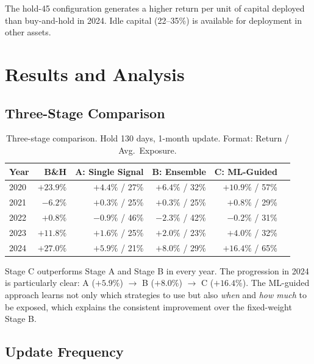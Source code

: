 \documentclass[11pt, letterpaper]{article}
\begin{document}
The hold-45 configuration generates a higher return per unit of capital deployed
than buy-and-hold in 2024. Idle capital (22--35\%) is available for deployment
in other assets.

\section{Results and Analysis}

\subsection{Three-Stage Comparison}

\begin{table}[h]
\centering
\caption{Three-stage comparison. Hold 130 days, 1-month update. Format: Return / Avg.\ Exposure.}
\label{tab:three_stage_h130}
\begin{tabular}{lrrrrr}
\toprule
Year    & B\&H      & A: Single Signal     & B: Ensemble          & C: ML-Guided \\
\midrule
2020    & $+23.9\%$ & $+4.4\%$ / 27\%      & $+6.4\%$ / 32\%      & $\mathbf{+10.9\%}$ / 57\% \\
2021    & $-6.2\%$  & $+0.3\%$ / 25\%      & $+0.3\%$ / 25\%      & $\mathbf{+0.8\%}$ / 29\% \\
2022    & $+0.8\%$  & $-0.9\%$ / 46\%      & $-2.3\%$ / 42\%      & $\mathbf{-0.2\%}$ / 31\% \\
2023    & $+11.8\%$ & $+1.6\%$ / 25\%      & $+2.0\%$ / 23\%      & $\mathbf{+4.0\%}$ / 32\% \\
2024    & $+27.0\%$ & $+5.9\%$ / 21\%      & $+8.0\%$ / 29\%      & $\mathbf{+16.4\%}$ / 65\% \\
\bottomrule
\end{tabular}
\end{table}

Stage C outperforms Stage A and Stage B in every year. The progression in 2024
is particularly clear: A ($+5.9\%$) $\to$ B ($+8.0\%$) $\to$ C ($+16.4\%$).
The ML-guided approach learns not only which strategies to use but also \textit{when}
and \textit{how much} to be exposed, which explains the consistent improvement over
the fixed-weight Stage B.

\subsection{Update Frequency}
\end{document}
